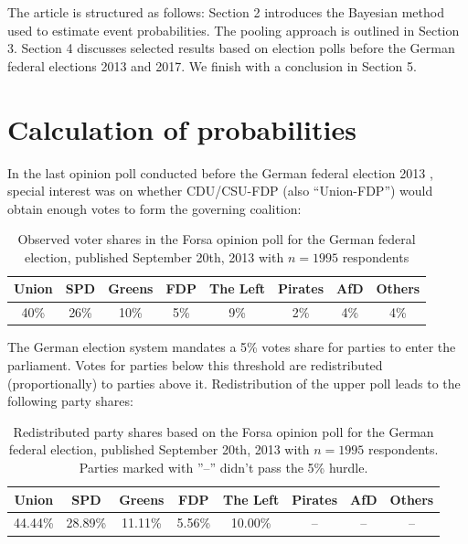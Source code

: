 \documentclass[smallcondensed]{svjour3}     %
\begin{document}
The article is structured as follows: Section 2 introduces the Bayesian method
used to estimate event probabilities. The pooling approach is outlined in
Section 3. Section 4 discusses selected results based on election polls before
the German federal elections 2013 and 2017.
We finish with a conclusion in Section 5.



\section{Calculation of probabilities} \label{sec:method}
In the last opinion poll conducted before the German federal election 2013 \citep{forsa_2013}, special interest was on whether CDU/CSU-FDP (also ``Union-FDP'') would obtain enough votes to form the governing coalition:

\begin{table}[!ht]\centering
\caption{Observed voter shares in the Forsa opinion poll for the German federal election, published September 20th, 2013 with $n=1995$ respondents
\label{tab_fdp}
}
\medskip
\begin{tabular}{cccccccc}
\toprule[0.09 em]
Union & SPD & Greens & FDP & The Left & Pirates & AfD & Others \\
\midrule
40\% & 26\% & 10\% & 5\% & 9\% & 2\% & 4\% & 4\% \\
\bottomrule[0.09 em]
\end{tabular}
\end{table}

The German election system mandates a 5\% votes share for parties to enter the parliament.
Votes for parties below this threshold are redistributed (proportionally) to parties
above it. Redistribution of the upper poll leads to the following party shares:

\begin{table}[!ht]\centering
\caption{Redistributed party shares based on the Forsa opinion poll for the German federal election, published September 20th, 2013 with $n=1995$ respondents. Parties marked with ''--'' didn't pass the 5\% hurdle.
\label{tab_fdp_redist}
}
\medskip
\begin{tabular}{cccccccc}
\toprule[0.09 em]
Union & SPD & Greens & FDP & The Left & Pirates & AfD & Others \\
\midrule
44.44\% & 28.89\% & 11.11\% & 5.56\% & 10.00\% & -- & -- & -- \\
\bottomrule[0.09 em]
\end{tabular}
\end{table}
\end{document}
